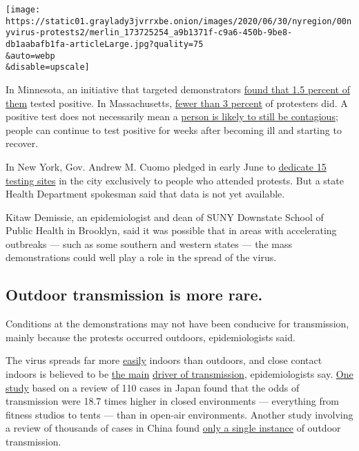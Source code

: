 \texttt{[image: https://static01.graylady3jvrrxbe.onion/images/2020/06/30/nyregion/00nyvirus-protests2/merlin\_173725254\_a9b1371f-c9a6-450b-9be8-db1aabafb1fa-articleLarge.jpg?quality=75\\\&auto=webp\\\&disable=upscale]}

In Minnesota, an initiative that targeted demonstrators
\href{https://www.startribune.com/minnesota-virus-cases-decline-despite-mass-protest-fears/571421142/?refresh=true}{found
that 1.5 percent of them} tested positive. In Massachusetts,
\href{https://www.bostonglobe.com/2020/06/23/nation/baker-25-percent-protesters-tested-positive-coronavirus/}{fewer
than 3 percent} of protesters did. A positive test does not necessarily
mean a
\href{https://www.statnews.com/2020/06/08/viral-shedding-covid19-pcr-montreal-baby/}{person
is likely to still be contagious}; people can continue to test positive
for weeks after becoming ill and starting to recover.

In New York, Gov. Andrew M. Cuomo pledged in early June to
\href{https://www.nytimes3xbfgragh.onion/2020/06/07/world/coronavirus-updates-us-usa.html}{dedicate
15 testing sites} in the city exclusively to people who attended
protests. But a state Health Department spokesman said that data is not
yet available.

Kitaw Demissie, an epidemiologist and dean of SUNY Downstate School of
Public Health in Brooklyn, said it was possible that in areas with
accelerating outbreaks --- such as some southern and western states ---
the mass demonstrations could well play a role in the spread of the
virus.

\hypertarget{outdoor-transmission-is-more-rare}{%
\subsection{Outdoor transmission is more
rare.}\label{outdoor-transmission-is-more-rare}}

Conditions at the demonstrations may not have been conducive for
transmission, mainly because the protests occurred outdoors,
epidemiologists said.

The virus spreads far more
\href{https://www.medrxiv.org/content/10.1101/2020.02.28.20029272v2.full.pdf}{easily}
indoors than outdoors, and close contact indoors is believed to be
\href{https://www.medrxiv.org/content/10.1101/2020.04.04.20053058v1.full.pdf}{the
main}
\href{https://wwwnc.cdc.gov/eid/article/26/6/20-0495_article}{driver of
transmission}, epidemiologists say.
\href{https://doi.org/10.1101/2020.02.28.20029272}{One study} based on a
review of 110 cases in Japan found that the odds of transmission were
18.7 times higher in closed environments --- everything from fitness
studios to tents --- than in open-air environments. Another study
involving a review of thousands of cases in China found
\href{https://www.medrxiv.org/content/10.1101/2020.04.04.20053058v1.full.pdf}{only
a single instance} of outdoor transmission.

